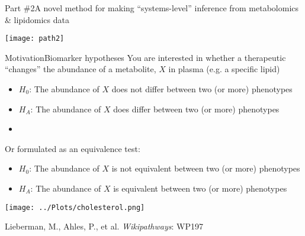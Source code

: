 \documentclass[xcolor=dvipsnames]{beamer}
\begin{document}
\begin{frame}{Part \#2}{A novel method for making ``systems-level'' inference from metabolomics \& lipidomics data}
\vspace{-15pt}
\begin{center}
	\texttt{[image: path2]}
\end{center}
\end{frame}

\begin{frame}{Motivation}{Biomarker hypotheses}
	\vspace{-10pt}
	You are interested in whether a therapeutic ``changes'' the abundance of a metabolite, $X$ in plasma (e.g. a specific lipid) \pause
	\begin{itemize}
		\item $H_0$: The abundance of $X$ does not differ between two (or more) phenotypes \pause
		\item $H_A$: The abundance of $X$ does differ between two (or more) phenotypes 
		\item[]
	\end{itemize} \pause
	
	Or formulated as an equivalence test:
	\begin{itemize}
		\item $H_0$: The abundance of $X$ is not equivalent between two (or more) phenotypes  
		\item $H_A$: The abundance of $X$ is equivalent between two (or more) phenotypes  
	\end{itemize}
\end{frame}

\begin{frame}
	\begin{center}
			\texttt{[image: ../Plots/cholesterol.png]}
			
			Lieberman, M., Ahles, P., et al. \emph{Wikipathways}: WP197
	\end{center}
\end{frame}
\end{document}
